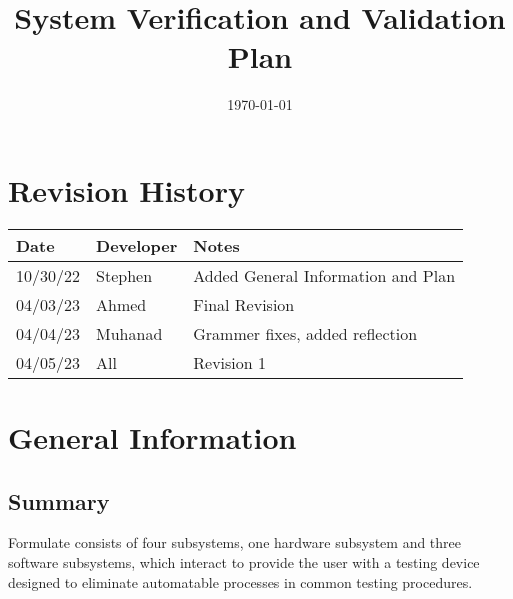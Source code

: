 \documentclass[12pt, titlepage]{article}
\begin{document}
\title{\huge System Verification and Validation Plan \\\progname{}} 
\author{\authname}
\date{\today}
	
\maketitle


\section{Revision History}

\begin{tabularx}{\textwidth}{p{3cm}p{2cm}X}
\toprule {\bf Date} & {\bf Developer} & {\bf Notes}\\
\midrule
10/30/22 & Stephen & Added General Information and Plan\\
04/03/23 & Ahmed & Final Revision\\
04/04/23 & Muhanad & Grammer fixes, added reflection \\
04/05/23 & All & Revision 1 \\


\bottomrule
\end{tabularx}

\newpage

\tableofcontents





\newpage



\section{General Information}

\subsection{Summary}


  Formulate consists of four subsystems, one hardware subsystem and three software subsystems, which interact to provide the user with a testing device designed to eliminate automatable processes in common testing procedures.\\
\end{document}
